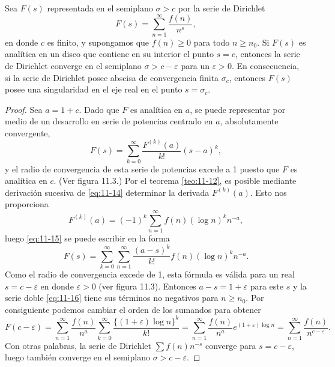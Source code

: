 \documentclass[12pt,a4paper]{book}
\begin{document}
    \begin{teorema}[Landau]\label{teo:11-13}
        Sea $F(s)$ representada en el semiplano $\sigma>c$ por la serie de Dirichlet
        \begin{equation}\label{eq:11-14}
            F(s)=\sum_{n=1}^{\infty}\frac{f(n)}{n^{s}},
        \end{equation}
        en donde $c$ es finito, y supongamos que $f(n)\geq0$ para todo $n\geq n_{0}$. Si $F(s)$
        es analítica en un disco que contiene en su interior el punto $s=c$, entonces la serie
        de Dirichlet converge en el semiplano $\sigma>c-\varepsilon$ para un $\varepsilon>0$.
        En consecuencia, si la serie de Dirichlet posee abscisa de convergencia finita
        $\sigma_{c}$, entonces $F(s)$ posee una singularidad en el eje real en el punto
        $s=\sigma_{c}$.
    \end{teorema}

    \begin{proof}
        Sea $a=1+c$. Dado que $F$ es analítica en $a$, se puede representar por medio de un
        desarrollo en serie de potencias centrado en $a$, absolutamente convergente,
        \begin{equation}\label{eq:11-15}
            F(s)=\sum_{k=0}^{\infty}\frac{F^{(k)}(a)}{k!}(s-a)^{k},
        \end{equation}
        y el radio de convergencia de esta serie de potencias excede a 1 puesto que $F$ es
        analítica en $c$. (Ver figura 11.3.) Por el teorema \ref{teo:11-12}, es posible
        mediante derivación sucesiva de \eqref{eq:11-14} determinar la derivada $F^{(k)}(a)$.
        Esto nos proporciona
        \begin{equation*}
            F^{(k)}(a)=(-1)^{k}\sum_{n=1}^{\infty}f(n)(\log n)^{k}n^{-a},
        \end{equation*}
        luego \eqref{eq:11-15} se puede escribir en la forma
        \begin{equation}\label{eq:11-16}
            F(s)=\sum_{k=0}^{\infty}\sum_{n=1}^{\infty}\frac{(a-s)^{k}}{k!}f(n)(\log n)^{k}n^{-a}.
        \end{equation}
        Como el radio de convergencia excede de 1, esta fórmula es válida para un real
        $s=c-\varepsilon$ en donde $\varepsilon>0$ (ver figura 11.3). Entonces
        $a-s=1+\varepsilon$ para este $s$ y la serie doble \eqref{eq:11-16} tiene sus términos
        no negativos para $n\geq n_{0}$. Por consiguiente podemos cambiar el orden de los
        sumandos para obtener
        \begin{equation*}
            F(c-\varepsilon)=\sum_{n=1}^{\infty}\frac{f(n)}{n^{a}}\sum_{k=0}^{\infty}\frac{\{(1+\varepsilon)\log n\}^{k}}{k!}=\sum_{n=1}^{\infty}\frac{f(n)}{n^{a}}e^{(1+\varepsilon)\log n}=\sum_{n=1}^{\infty}\frac{f(n)}{n^{c-\varepsilon}}.
        \end{equation*}
        Con otras palabras, la serie de Dirichlet $\sum f(n)n^{-s}$ converge para
        $s=c-\varepsilon$, luego también converge en el semiplano $\sigma>c-\varepsilon$.
    \end{proof}
\end{document}
